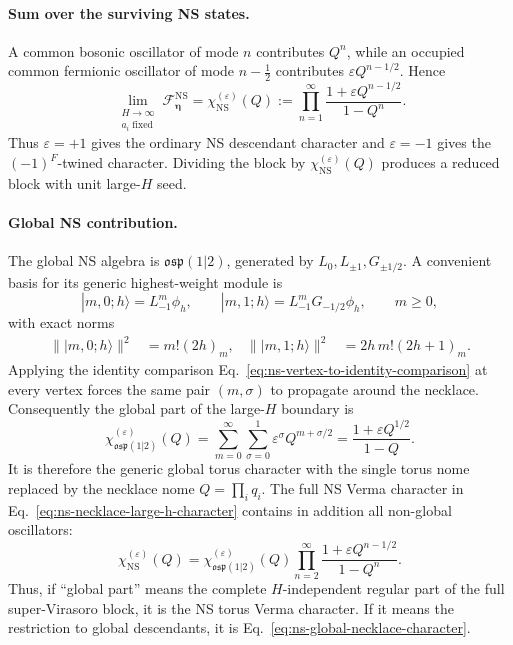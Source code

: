\documentclass[11pt]{article}
\newcommand{\NS}{\mathrm{NS}}
\newcommand{\F}{\mathcal F}
\begin{document}
\paragraph{Sum over the surviving NS states.}
A common bosonic oscillator of mode \(n\) contributes \(Q^n\), while an
occupied common fermionic oscillator of mode \(n-\frac12\) contributes
\(\varepsilon Q^{n-1/2}\).  Hence
\begin{equation}
 \boxed{
 \lim_{\substack{H\to\infty\\a_i\;\mathrm{fixed}}}
 \F^{\NS}_{\boldsymbol\eta}
 =
 \chi^{(\varepsilon)}_{\NS}(Q)
 :=
 \prod_{n=1}^{\infty}
 \frac{1+\varepsilon Q^{n-1/2}}{1-Q^n}.}
 \label{eq:ns-necklace-large-h-character}
\end{equation}
Thus \(\varepsilon=+1\) gives the ordinary NS descendant character and
\(\varepsilon=-1\) gives the \((-1)^F\)-twined character.  Dividing the
block by \(\chi^{(\varepsilon)}_{\NS}(Q)\) produces a reduced block with
unit large-\(H\) seed.

\paragraph{Global NS contribution.}
The global NS algebra is \(\mathfrak{osp}(1|2)\), generated by
\(L_0,L_{\pm1},G_{\pm1/2}\).  A convenient basis for its generic
highest-weight module is
\begin{equation}
 |m,0;h\rangle=L_{-1}^{m}\phi_h,
 \qquad
 |m,1;h\rangle=L_{-1}^{m}G_{-1/2}\phi_h,
 \qquad m\geq0,
 \label{eq:ns-global-basis}
\end{equation}
with exact norms
\begin{align}
 \lVert |m,0;h\rangle\rVert^2
 &=m!(2h)_m,
 &
 \lVert |m,1;h\rangle\rVert^2
 &=2h\,m!(2h+1)_m.
 \label{eq:ns-global-norms}
\end{align}
Applying the identity comparison
Eq.~\eqref{eq:ns-vertex-to-identity-comparison} at every vertex forces the
same pair \((m,\sigma)\) to propagate around the necklace.  Consequently
the global part of the large-\(H\) boundary is
\begin{equation}
 \chi^{(\varepsilon)}_{\mathfrak{osp}(1|2)}(Q)
 =
 \sum_{m=0}^{\infty}\sum_{\sigma=0}^{1}
 \varepsilon^\sigma Q^{m+\sigma/2}
 =
 \frac{1+\varepsilon Q^{1/2}}{1-Q}.
 \label{eq:ns-global-necklace-character}
\end{equation}
It is therefore the generic global torus character with the single torus
nome replaced by the necklace nome \(Q=\prod_iq_i\).  The full NS Verma
character in Eq.~\eqref{eq:ns-necklace-large-h-character} contains in
addition all non-global oscillators:
\begin{equation}
 \chi^{(\varepsilon)}_{\NS}(Q)
 =
 \chi^{(\varepsilon)}_{\mathfrak{osp}(1|2)}(Q)
 \prod_{n=2}^{\infty}
 \frac{1+\varepsilon Q^{n-1/2}}{1-Q^n}.
 \label{eq:ns-character-global-factorization}
\end{equation}
Thus, if ``global part'' means the complete \(H\)-independent regular part
of the full super-Virasoro block, it is the NS torus Verma character.  If it
means the restriction to global descendants, it is
Eq.~\eqref{eq:ns-global-necklace-character}.
\end{document}
